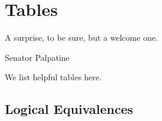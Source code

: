 \documentclass[main.tex]{subfiles}
\begin{document}

\appendixpage
\noappendicestocpagenum
\addappheadtotoc

\chapter{Tables}
\label{appendix:tables}

\epigraph{A surprise, to be sure, but a welcome one.}{Senator Palpatine}

\minitoc

We list helpful tables here.

\section{Logical Equivalences}
\end{document}
